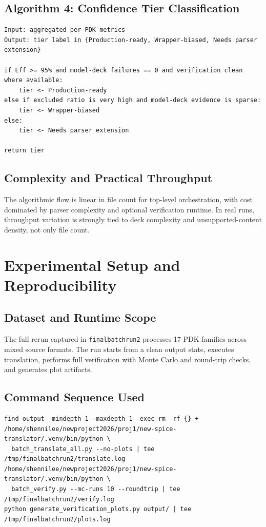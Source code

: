 \documentclass[12pt,a4paper,oneside]{report}
\begin{document}
\section{Algorithm 4: Confidence Tier Classification}

\begin{lstlisting}[style=pseudo,caption={PDK Confidence Tier Ranking},label={alg:tier}]
Input: aggregated per-PDK metrics
Output: tier label in {Production-ready, Wrapper-biased, Needs parser extension}

if Eff >= 95% and model-deck failures == 0 and verification clean where available:
    tier <- Production-ready
else if excluded ratio is very high and model-deck evidence is sparse:
    tier <- Wrapper-biased
else:
    tier <- Needs parser extension

return tier
\end{lstlisting}

\section{Complexity and Practical Throughput}
The algorithmic flow is linear in file count for top-level orchestration, with cost dominated by parser complexity and optional verification runtime. In real runs, throughput variation is strongly tied to deck complexity and unsupported-content density, not only file count.

\chapter{Experimental Setup and Reproducibility}

\section{Dataset and Runtime Scope}
The full rerun captured in \texttt{finalbatchrun2} processes 17 PDK families across mixed source formats. The run starts from a clean output state, executes translation, performs full verification with Monte Carlo and round-trip checks, and generates plot artifacts.

\section{Command Sequence Used}
\begin{lstlisting}[style=bash,caption={Command sequence used for the latest clean rerun evidence package.}]
find output -mindepth 1 -maxdepth 1 -exec rm -rf {} +
/home/shennilee/newproject2026/proj1/new-spice-translator/.venv/bin/python \
  batch_translate_all.py --no-plots | tee /tmp/finalbatchrun2/translate.log
/home/shennilee/newproject2026/proj1/new-spice-translator/.venv/bin/python \
  batch_verify.py --mc-runs 10 --roundtrip | tee /tmp/finalbatchrun2/verify.log
python generate_verification_plots.py output/ | tee /tmp/finalbatchrun2/plots.log
\end{lstlisting}
\end{document}

